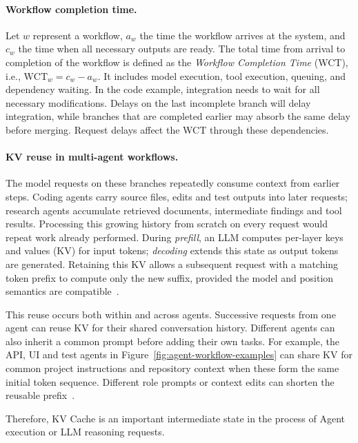 \paragraph{Workflow completion time.}
Let $w$ represent a workflow, $a_w$ the time the workflow arrives at the system, and $c_w$ the time when all necessary outputs are ready. The total time from arrival to completion of the workflow is defined as the \emph{Workflow Completion Time} (WCT), i.e., $\mathrm{WCT}_w=c_w-a_w$. It includes model execution, tool execution, queuing, and dependency waiting. In the code example, integration needs to wait for all necessary modifications. Delays on the last incomplete branch will delay integration, while branches that are completed earlier may absorb the same delay before merging. Request delays affect the WCT through these dependencies.




\paragraph{KV reuse in multi-agent workflows.}
The model requests on these branches repeatedly consume context from
earlier steps. Coding agents carry source files, edits and test outputs
into later requests; research agents accumulate retrieved documents,
intermediate findings and tool results. Processing this growing history
from scratch on every request would repeat work already performed.
During \emph{prefill}, an LLM computes per-layer keys and values (KV)
for input tokens; \emph{decoding} extends this state as output tokens
are generated. Retaining this KV allows a subsequent request with a
matching token prefix to compute only the new suffix, provided the model
and position semantics are compatible~\cite{gao2024cachedattention,zheng2024sglang}.

This reuse occurs both within and across agents. Successive requests
from one agent can reuse KV for their shared conversation history.
Different agents can also inherit a common prompt before adding their
own tasks. For example, the API, UI and test agents in
Figure~\ref{fig:agent-workflow-examples} can share KV for common project
instructions and repository context when these form the same initial
token sequence. Different role prompts or context edits can shorten
the reusable prefix~\cite{zheng2024sglang}.

Therefore, KV Cache is an important intermediate state in the process of Agent execution or LLM reasoning requests.


